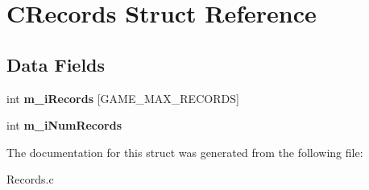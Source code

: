 \hypertarget{struct_c_records}{}\section{C\+Records Struct Reference}
\label{struct_c_records}
\subsection*{Data Fields}
\begin{DoxyCompactItemize}
\item 
\mbox{\label{struct_c_records_a79504165f16aba5faf5b24cebc19e4aa}} 
int {\bfseries m\+\_\+i\+Records} \mbox{[}G\+A\+M\+E\+\_\+\+M\+A\+X\+\_\+\+R\+E\+C\+O\+R\+DS\mbox{]}
\item 
\mbox{\label{struct_c_records_a79e929377e133755db4c69991c7ccd53}} 
int {\bfseries m\+\_\+i\+Num\+Records}
\end{DoxyCompactItemize}


The documentation for this struct was generated from the following file\+:\begin{DoxyCompactItemize}
\item 
Records.\+c\end{DoxyCompactItemize}
